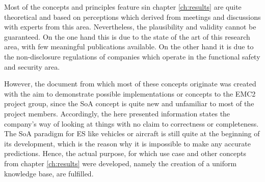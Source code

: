 Most of the concepts and principles feature sin chapter \ref{ch:results} are quite theoretical and based on perceptions which derived from meetings and discussions with experts from this area. Nevertheless, the plausibility and validity cannot be guaranteed. On the one hand this is due to the state of the art of this research area, with few meaningful publications available. On the other hand it is due to the non-disclosure regulations of companies which operate in the functional safety and security area.

However, the document from which most of these concepts originate was created with the aim to demonstrate possible implementations or concepts to the EMC2 project group, since the SoA concept is quite new and unfamiliar to most of the project members. Accordingly, the here presented information states the company's way of looking at things with no claim to correctness or completeness. The SoA paradigm for ES like vehicles or aircraft is still quite at the beginning of its development, which is the reason why it is impossible to make any accurate predictions. Hence, the actual purpose, for which use case and other concepts from chapter \ref{ch:results} were developed, namely the creation of a uniform knowledge base, are fulfilled.